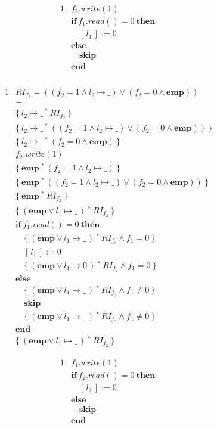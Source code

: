 \documentclass[12pt]{article}
\newcommand{\ifstmt}[3]{
  & \textbf{if}\ #1\ \textbf{then}\ \\
  #2\ \\
  & \textbf{else} \\
  #3\ \\
  & \textbf{end} \\
}
\newcommand{\mt}[2]{
  #1 \mapsto #2
}
\newcommand{\sepcon}[2]{
  #1\ ^*\ #2
}
\newcommand{\emp}{
  \textbf{emp}
}
\newcommand{\riftwofst}{
  (f_2 = 1 \land \mt{l_2}{\_})
}
\newcommand{\riftwosnd}{
  ( f_2 = 0 \land \emp)
}
\newcommand{\riftwo}{
  (\riftwofst \lor \riftwosnd)
}
\begin{document}
\begin{alignat*}{1}
  &  f_2.write(1) \\
  \ifstmt{ f_1.read() = 0}{& \quad [\,l_1\,] := 0}{& \quad \textbf{skip}} \\
\end{alignat*}

\begin{alignat*}{1}
  & RI_{f_2} = \riftwo \\
  & - \\
  & \{\ \sepcon{\mt{l_2}{\_}}{RI_{f_2}}\ \} \\
  & \{\ \sepcon{\mt{l_2}{\_}}{\riftwo}\ \} \\
  & \{\ \sepcon{\mt{l_2}{\_}}{\riftwosnd}\ \} \\
  &  f_2.write( 1 ) \\
  & \{\ \sepcon{\emp}{\riftwofst} \ \} \\
  & \{\ \sepcon{\emp}{\riftwo} \ \} \\
  & \{\ \sepcon{\emp}{RI_{f_2}} \ \} \\
  & \{\ \sepcon{(\emp \lor \mt{l_1}{\_}\,)}{RI_{f_2}}\ \} \\
  \ifstmt{
    f_1.read() = 0
  }{
    & \quad \{\ \sepcon{(\emp \lor \mt{l_1}{\_}\,)}{RI_{f_2}} \land f_1 = 0\ \} \\
    & \quad [\,l_1\,] := 0 \\
    & \quad \{\
    \sepcon{
      (\emp \lor \mt{l_1}{0}\,)
    }{
      RI_{f_2}
    }
    \land f_1 = 0\ \}
  }{
    & \quad \{\
    \sepcon{
      (\emp \lor \mt{l_1}{\_}\,)
    }{
      RI_{f_2}
    }
    \land f_1 \neq 0\ \} \\
    & \quad \textbf{skip} \\
    & \quad \{\
    \sepcon{
      (\emp \lor \mt{l_1}{\_}\,)
    }{
      RI_{f_2}
    }
    \land f_1 \neq 0\ \}
  }
  & \{\ \sepcon{ (\emp \lor \mt{l_1}{\_}\,) }{ RI_{f_2} } \ \}
\end{alignat*}

\newpage

\begin{alignat*}{1}
  &  f_1.write(1) \\
  \ifstmt{ f_2.read() = 0}{& \quad [\,l_2\,] := 0}{& \quad \textbf{skip}} \\
\end{alignat*}
\end{document}
